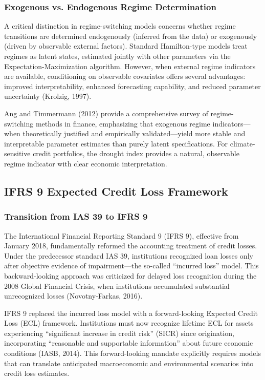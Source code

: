 \documentclass[12pt,a4paper]{article}
\begin{document}
\subsubsection{Exogenous vs. Endogenous Regime Determination}

A critical distinction in regime-switching models concerns whether regime transitions are determined endogenously (inferred from the data) or exogenously (driven by observable external factors). Standard Hamilton-type models treat regimes as latent states, estimated jointly with other parameters via the Expectation-Maximization algorithm. However, when external regime indicators are available, conditioning on observable covariates offers several advantages: improved interpretability, enhanced forecasting capability, and reduced parameter uncertainty (Krolzig, 1997).

Ang and Timmermann (2012) provide a comprehensive survey of regime-switching methods in finance, emphasizing that exogenous regime indicators---when theoretically justified and empirically validated---yield more stable and interpretable parameter estimates than purely latent specifications. For climate-sensitive credit portfolios, the drought index provides a natural, observable regime indicator with clear economic interpretation.

\subsection{IFRS 9 Expected Credit Loss Framework}

\subsubsection{Transition from IAS 39 to IFRS 9}

The International Financial Reporting Standard 9 (IFRS 9), effective from January 2018, fundamentally reformed the accounting treatment of credit losses. Under the predecessor standard IAS 39, institutions recognized loan losses only after objective evidence of impairment---the so-called ``incurred loss'' model. This backward-looking approach was criticized for delayed loss recognition during the 2008 Global Financial Crisis, when institutions accumulated substantial unrecognized losses (Novotny-Farkas, 2016).

IFRS 9 replaced the incurred loss model with a forward-looking Expected Credit Loss (ECL) framework. Institutions must now recognize lifetime ECL for assets experiencing ``significant increase in credit risk'' (SICR) since origination, incorporating ``reasonable and supportable information'' about future economic conditions (IASB, 2014). This forward-looking mandate explicitly requires models that can translate anticipated macroeconomic and environmental scenarios into credit loss estimates.
\end{document}
